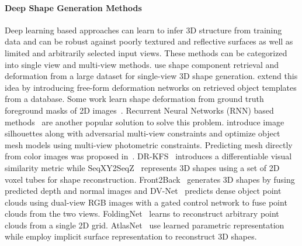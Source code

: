 \paragraph{Deep Shape Generation Methods}
 Deep learning based approaches can learn to infer 3D structure from training data and can be robust against poorly textured and reflective surfaces as well as limited and arbitrarily selected input views. These methods can be categorized into single view and multi-view methods.
\cite{huang2015single, su2014estimating} use shape component retrieval and deformation from a large dataset for single-view 3D shape generation.
\cite{kurenkov2018deformnet} extend this idea by introducing free-form deformation networks on retrieved object templates from a database.
Some work learn shape deformation from ground truth foreground masks of 2D images~\cite{kar2015category,yan2016perspective,tulsiani2017multi}.
Recurrent Neural Networks (RNN) based methods~\cite{3dr2n2, kar2017lsm, mcrecon2017} are another popular solution to solve this problem.
\cite{mcrecon2017, lin2019photometric} introduce image silhouettes along with adversarial multi-view constraints and optimize object mesh models using multi-view photometric constraints.
Predicting mesh directly from color images was proposed in~\cite{wang2018pixel2mesh, wickramasinghe2019voxel2mesh,pan2019deep,wen2019pixel2mesh++, gkioxari2019meshrcnn, tang2019skeleton}.
DR-KFS~\cite{jin2019drkfs} introduces a differentiable visual similarity metric
while SeqXY2SeqZ~\cite{han2020seqxy2seqz} represents 3D shapes using a set of 2D voxel tubes for shape reconstruction.
Front2Back~\cite{yao2020front2back} generates 3D shapes by fusing predicted depth and normal images and
DV-Net~\cite{jia2020dv} predicts dense object point clouds using dual-view RGB images with a gated control network to fuse point clouds from the two views.
FoldingNet~\cite{yang2018foldingnet} learns to reconstruct arbitrary point clouds from a single 2D grid.
AtlasNet~\cite{groueix2018papier} use learned parametric representation
while \cite{mescheder2019occupancy,park2019deepsdf,liu2019learning,liu2019dist,murez2020atlas} employ implicit surface representation to reconstruct 3D shapes.

